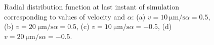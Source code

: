 \documentclass[../../master_thesis_np.tex]{subfiles}
\begin{document}
		\begin{figure}[hbtp]
			\centering\
			\\
			\\
			
			\caption{Radial distribution function at last instant of simulation corresponding to values of velocity and $\alpha$: (a) $v = \SI{10}{\um \per \second} \alpha = 0.5$, (b) $v = \SI{20}{\um \per \second} \alpha = 0.5$, (c) $v = \SI{10}{\um \per \second} \alpha = -0.5$, (d) $v = \SI{20}{\um \per \second} \alpha = -0.5$.}
			\label{fig:lj_velocity_rdf}
		\end{figure}
\end{document}
